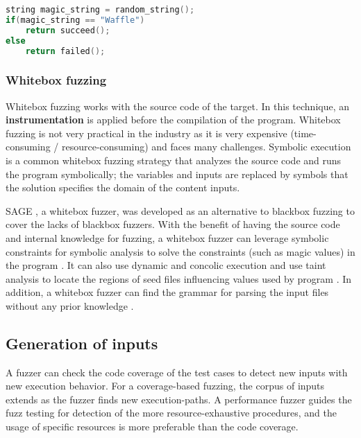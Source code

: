 \begin{lstlisting}[language=C++,style=CodeStyle,caption=Magic Value: \texttt{Waffle} is a magic value,label={lst:magic}]
string magic_string = random_string();
if(magic_string == "Waffle")
    return succeed();
else
    return failed();
\end{lstlisting}

% 
\subsubsection{Whitebox fuzzing}
Whitebox fuzzing works with the source code of the target. In this technique, an \textbf{instrumentation} is applied before the compilation of the program. Whitebox fuzzing is not very practical in the industry as it is very expensive (time-consuming / resource-consuming) and faces many challenges. Symbolic execution \cite{king1976symbolic} is a common whitebox fuzzing strategy that analyzes the source code and runs the program symbolically; the variables and inputs are replaced by symbols that the solution specifies the domain of the content inputs. 

SAGE \cite{godefroid2012sage}, a whitebox fuzzer, was developed as an alternative to blackbox fuzzing to cover the lacks of blackbox fuzzers. With the benefit of having the source code and internal knowledge for fuzzing, a whitebox fuzzer can leverage symbolic constraints for symbolic analysis to solve the constraints (such as magic values) in the program \cite{cadar2011symbolic}. It can also use dynamic and concolic execution \cite{stephens2016driller} and use taint analysis to locate the regions of seed files influencing values used by program \cite{ganesh2009taint}. In addition, a whitebox fuzzer can find the grammar for parsing the input files without any prior knowledge \cite{godefroid2008grammar}.


\subsection{Generation of inputs}

A fuzzer can check the code coverage of the test cases to detect new inputs with new execution behavior. For a coverage-based fuzzing, the corpus of inputs extends as the fuzzer finds new execution-paths. A performance fuzzer guides the fuzz testing for detection of the more resource-exhaustive procedures, and the usage of specific resources is more preferable than the code coverage.

